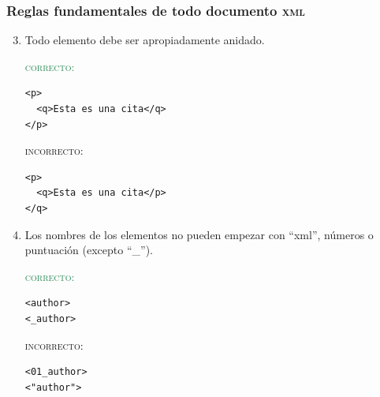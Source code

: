 \documentclass[%
  handout, %
  ]{beamer}
\newcommand*{\rojo}[1]{\textcolor[HTML]{8B0000}{#1}}
\newcommand*{\verde}[1]{\textcolor{seagreen}{#1}}
\newcommand*{\XML}{\textsc{xml}}
\begin{document}
\begin{frame}[fragile]
  \frametitle{Reglas fundamentales de todo documento \XML}
  \begin{enumerate}
      \setcounter{enumi}{2}
    \item Todo elemento debe ser apropiadamente anidado.

      \medskip

      \begin{minipage}{0.4\linewidth}
      \verde{\textsc{correcto}:}
\begin{verbatim}
<p>
  <q>Esta es una cita</q>
</p>

\end{verbatim}        
    \end{minipage}%
      \hfill%
      \begin{minipage}{0.5\linewidth}
   \rojo{\textsc{incorrecto}:}
\begin{verbatim}
<p>
  <q>Esta es una cita</p>
</q>

\end{verbatim}
      \end{minipage}%
      
    \item Los nombres de los elementos no pueden empezar con \enquote{xml}, números o puntuación (excepto \enquote{\_}).

      \medskip
      
      \begin{minipage}{0.4\linewidth}
      \verde{\textsc{correcto}:}
\begin{verbatim}
<author>
<_author>
\end{verbatim}        
    \end{minipage}%
      \hfill%
      \begin{minipage}{0.5\linewidth}
   \rojo{\textsc{incorrecto}:}
\begin{verbatim}
<01_author>
<"author">
\end{verbatim}
      \end{minipage}%
  \end{enumerate}
\end{frame}
\end{document}

